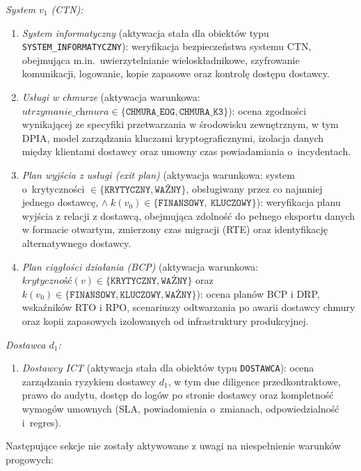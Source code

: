 \noindent\textit{System $v_1$ (CTN):}
\begin{enumerate}[label=(\roman*), resume]
  \item \textit{System informatyczny} (aktywacja stała dla obiektów typu \texttt{SYSTEM\_INFORMATYCZNY}): weryfikacja bezpieczeństwa systemu CTN, obejmująca m.in.\ uwierzytelnianie wieloskładnikowe, szyfrowanie komunikacji, logowanie, kopie zapasowe oraz kontrolę dostępu dostawcy.

  \item \textit{Usługi w chmurze} (aktywacja warunkowa: $\textit{utrzymanie\_chmura} \in \{\texttt{CHMURA\_EOG}, \texttt{CHMURA\_K3}\}$): ocena zgodności wynikającej ze specyfiki przetwarzania w środowisku zewnętrznym, w tym DPIA, model zarządzania kluczami kryptograficznymi, izolacja danych między klientami dostawcy oraz umowny czas powiadamiania o~incydentach.

  \item \textit{Plan wyjścia z usługi (exit plan)} (aktywacja warunkowa: system o~krytyczności $\in \{\texttt{KRYTYCZNY}, \texttt{WAŻNY}\}$, obsługiwany przez co najmniej jednego dostawcę, $\land\; k(v_0) \in \{\texttt{FINANSOWY},\ \texttt{KLUCZOWY}\}$): weryfikacja planu wyjścia z relacji z dostawcą, obejmująca zdolność do pełnego eksportu danych w formacie otwartym, zmierzony czas migracji (RTE) oraz identyfikację alternatywnego dostawcy.

  \item \textit{Plan ciągłości działania (BCP)} (aktywacja warunkowa: $\textit{krytyczność}(v) \in \{\texttt{KRYTYCZNY}, \texttt{WAŻNY}\}$ oraz $k(v_0) \in \{\texttt{FINANSOWY}, \texttt{KLUCZOWY}, \texttt{WAŻNY}\}$): ocena planów BCP i DRP, wskaźników RTO i RPO, scenariuszy odtwarzania po awarii dostawcy chmury oraz kopii zapasowych izolowanych od infrastruktury produkcyjnej.
\end{enumerate}

\noindent\textit{Dostawca $d_1$:}
\begin{enumerate}[label=(\roman*), resume]
  \item \textit{Dostawcy ICT} (aktywacja stała dla obiektów typu \texttt{DOSTAWCA}): ocena zarządzania ryzykiem dostawcy $d_1$, w tym due diligence przedkontraktowe, prawo do audytu, dostęp do logów po stronie dostawcy oraz kompletność wymogów umownych (SLA, powiadomienia o~zmianach, odpowiedzialność i~regres).
\end{enumerate}

Następujące sekcje nie zostały aktywowane z uwagi na niespełnienie warunków progowych:

